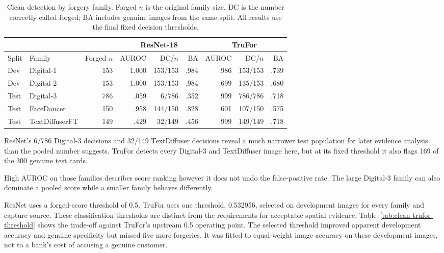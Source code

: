 \begin{table}[htbp]
\centering
\small
\setlength{\tabcolsep}{4.5pt}
\caption{Clean detection by forgery family. Forged $n$ is the original family size. DC is the number correctly called forged; BA includes genuine images from the same split. All results use the final fixed decision thresholds.}
\label{tab:clean-detection}

\begin{tabular}{@{}llr|rrr|rrr@{}}
\toprule
 & & &
\multicolumn{3}{|c}{ResNet-18} &
\multicolumn{3}{|c}{TruFor} \\
\midrule

Split & Family & Forged $n$
& AUROC & DC/$n$ & BA
& AUROC & DC/$n$ & BA \\
\midrule

Dev & Digital-1 & 153 & 1.000 & 153/153 & .984 & .986 & 153/153 & .739 \\
Dev & Digital-2 & 153 & 1.000 & 153/153 & .984 & .699 & 135/153 & .680 \\
\midrule

Test & Digital-3 & 786 & .059 & 6/786 & .352 & .999 & 786/786 & .718 \\
Test & FaceDancer & 150 & .958 & 144/150 & .828 & .601 & 107/150 & .575 \\
Test & TextDiffuserFT & 149 & .429 & 32/149 & .456 & .999 & 149/149 & .718 \\

\bottomrule
\end{tabular}
\end{table}

ResNet's 6/786 Digital-3 decisions and 32/149 TextDiffuser decisions reveal a much narrower test population for later evidence analysis than the pooled number suggests. 
TruFor detects every Digital-3 and TextDiffuser image here, but at its fixed threshold it also flags 169 of the 300 genuine test cards. 

High AUROC on those families describes score ranking however it does not undo the false-positive rate. The large Digital-3 family can also dominate a pooled score while a smaller family behaves differently.

ResNet uses a forged-score threshold of 0.5. TruFor uses one threshold, 0.532956, selected on development images for every family and capture source. 
These classification thresholds are distinct from the requirements for acceptable spatial evidence. Table~\ref{tab:clean-trufor-threshold} shows the trade-off against TruFor's upstream 0.5 operating point. The selected threshold improved apparent development accuracy and genuine specificity but missed five more forgeries. It was fitted to equal-weight image accuracy on these development images, not to a bank's cost of accusing a genuine customer.

